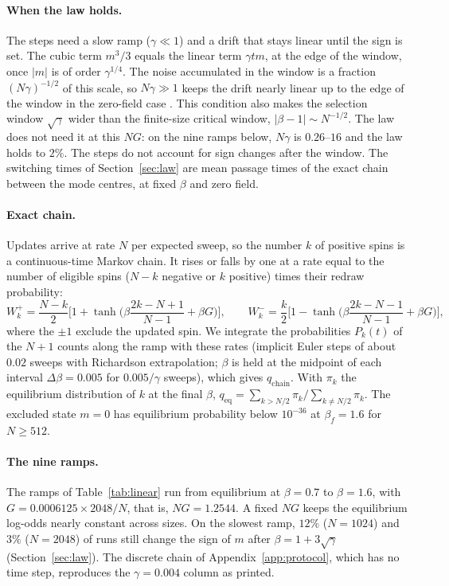 \documentclass[final]{dynafront2026}
\newcommand{\qeq}{q_{\mathrm{eq}}}
\newcommand{\qchain}{q_{\mathrm{chain}}}
\begin{document}
\paragraph{When the law holds.}
The steps need a slow ramp ($\gamma\ll1$) and a drift that stays linear until
the sign is set. The cubic term $m^3/3$ equals the linear term $\gamma tm$,
at the edge of the window, once $|m|$ is of order $\gamma^{1/4}$. The noise
accumulated in the window is a fraction $(N\gamma)^{-1/2}$ of this scale, so
$N\gamma\gg1$ keeps the drift nearly linear up to the edge of the window in
the zero-field case \citep{berglundgentz2002}. This condition also makes the
selection window $\sqrt\gamma$ wider than the finite-size critical window,
$|\beta-1|\sim N^{-1/2}$. The law does not need it at this $NG$: on the nine ramps below,
$N\gamma$ is $0.26$--$16$ and the law holds to $2\%$. The steps do not account for sign changes after the window. The switching times of
Section~\ref{sec:law} are mean passage times of the exact chain between the
mode centres, at fixed $\beta$ and zero field.

\paragraph{Exact chain.}
Updates arrive at rate $N$ per expected sweep, so the number $k$ of positive
spins is a continuous-time Markov chain. It rises or falls by one at a rate
equal to the number of eligible spins ($N-k$ negative or $k$ positive) times
their redraw probability:
\[
 W_k^+=\frac{N-k}{2}\Big[1+\tanh\!\Big(\beta\frac{2k-N+1}{N-1}+\beta G\Big)\Big],
 \qquad
 W_k^-=\frac{k}{2}\Big[1-\tanh\!\Big(\beta\frac{2k-N-1}{N-1}+\beta G\Big)\Big],
\]
where the $\pm1$ exclude the updated spin. We integrate the probabilities
$P_k(t)$ of the $N+1$ counts along the ramp with these rates (implicit Euler
steps of about $0.02$ sweeps with Richardson extrapolation; $\beta$ is held
at the midpoint of each interval $\Delta\beta=0.005$ for $0.005/\gamma$
sweeps), which gives $\qchain$. With $\pi_k$ the
equilibrium distribution of $k$ at the final $\beta$,
$\qeq=\sum_{k>N/2}\pi_k/\sum_{k\ne N/2}\pi_k$. The excluded state $m=0$ has
equilibrium probability below $10^{-36}$ at $\beta_f=1.6$ for $N\ge512$.

\paragraph{The nine ramps.}
The ramps of Table~\ref{tab:linear} run from equilibrium at $\beta=0.7$ to
$\beta=1.6$, with $G=0.0006125\times2048/N$, that is, $NG=1.2544$. A fixed
$NG$ keeps the equilibrium log-odds nearly constant across sizes. On the slowest ramp, $12\%$ ($N=1024$) and $3\%$ ($N=2048$) of runs still change the sign of $m$ after $\beta=1+3\sqrt\gamma$ (Section~\ref{sec:law}). The discrete chain of
Appendix~\ref{app:protocol}, which has no time step, reproduces the
$\gamma=0.004$ column as printed.
\end{document}
